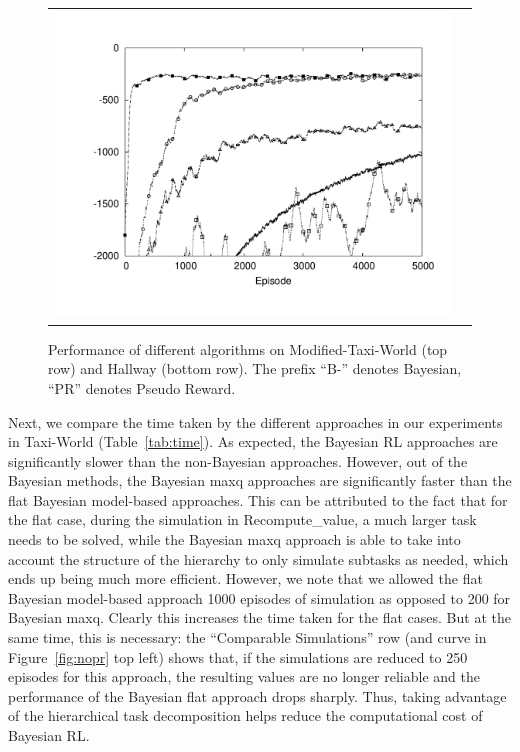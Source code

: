 \begin{figure}[ht]
\begin{tabular}{cc}
\includegraphics[trim=50 50 30 50, clip, scale=0.3]{exp/Hallwaynb.pdf} \\
\end{tabular}
\caption{Performance of different algorithms on {\sf Modified-Taxi-World} (top row) and {\sf Hallway} (bottom row). The
prefix ``B-'' denotes Bayesian, ``PR'' denotes Pseudo Reward.}\label{fig:pr}
\vspace{-0.2in}\end{figure}

Next, we compare the time taken by the different approaches in our
experiments in {\sf Taxi-World} (Table~\ref{tab:time}). As expected, the
Bayesian RL approaches are significantly slower than the non-Bayesian
approaches. However, out of the Bayesian methods, the Bayesian {\sc maxq} approaches are
significantly faster than the flat Bayesian model-based
approaches. This can be attributed to the fact that for the flat case,
during the simulation in {\sc Recompute\_value}, a much larger task
needs to be solved, while the Bayesian {\sc maxq} approach is able to take
into account the structure of the hierarchy to only simulate subtasks
as needed, which ends up being much more efficient. However, we note
that we allowed the flat Bayesian model-based approach 1000 episodes
of simulation as opposed to 200 for Bayesian {\sc maxq}. Clearly this
increases the time taken for the flat cases. But at the same time,
this is necessary: the ``Comparable Simulations'' row (and curve in
Figure~\ref{fig:nopr} top left) shows that, if the simulations are reduced to
250 episodes for this approach, the resulting values are no longer reliable and the performance of
the Bayesian flat approach drops sharply. Thus, taking advantage of
the hierarchical task decomposition helps reduce the computational cost of
Bayesian RL.



